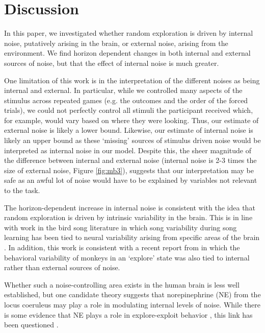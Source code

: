 \documentclass[12pt]{article}
\begin{document}
	\section*{Discussion}
	In this paper, we investigated whether random exploration is driven by internal noise, putatively arising in the brain, or external noise, arising from the environment.  We find horizon dependent changes in both internal and external sources of noise, but that the effect of internal noise is much greater. 
	
	One limitation of this work is in the interpretation of the different noises as being internal and external. In particular, while we controlled many aspects of the stimulus across repeated games (e.g. the outcomes and the order of the forced trials), we could not perfectly control all stimuli the participant received which, for example, would vary based on where they were looking. Thus, our estimate of external noise is likely a lower bound. Likewise, our estimate of internal noise is likely an upper bound as these `missing' sources of stimulus driven noise would be interpreted as internal noise in our model. Despite this, the sheer magnitude of the difference between internal and external noise (internal noise is 2-3 times the size of external noise, Figure \ref{fig:mb3}), suggests that our interpretation may be safe as an awful lot of noise would have to be explained by variables not relevant to the task.  
	
	The horizon-dependent increase in internal noise is consistent with the idea that random exploration is driven by intrinsic variability in the brain. This is in line with work in the bird song literature in which song variability during song learning has been tied to neural variability arising from specific areas of the brain \citep{songbird1, songbird2}. In addition, this work is consistent with a recent report from \cite{ebitz17} in which the behavioral variability of monkeys in an `explore' state was also tied to internal rather than external sources of noise. 
	
	Whether such a noise-controlling area exists in the human brain is less well established, but one candidate theory \citep{aj2005} suggests that norepinephrine (NE) from the locus coeruleus may play a role in modulating internal levels of noise.  While there is some evidence that NE plays a role in explore-exploit behavior \citep{jepma2012}, this link has been questioned \citep{nieuwenhuis05}.
	
\end{document}
